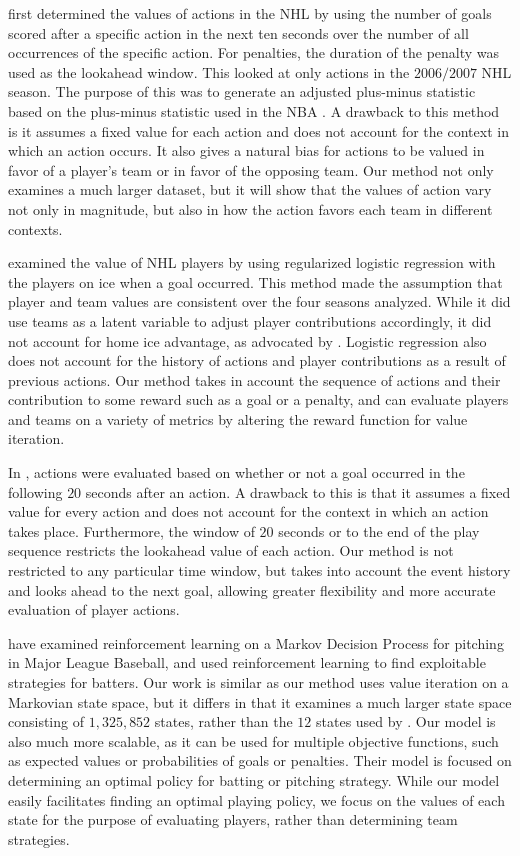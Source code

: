 \documentclass[]{article}
\begin{document}
\citep{Lock2009} first determined the values of actions in the NHL by using the number of goals scored after a specific action in the next ten seconds over the number of all occurrences of the specific action. For penalties, the duration of the penalty was used as the lookahead window. This looked at only actions in the $2006/2007$ NHL season. The purpose of this was to generate an adjusted plus-minus statistic based on the plus-minus statistic used in the NBA \citep{Rosenbaum2004}. A drawback to this method is it assumes a fixed value for each action and does not account for the context in which an action occurs. It also gives a natural bias for actions to be valued in favor of a player's team or in favor of the opposing team. Our method not only examines a much larger dataset, but it will show that the values of action vary not only in magnitude, but also in how the action favors each team in different contexts.

\citep{Gramacy2013} examined the value of NHL players by using regularized logistic regression with the players on ice when a goal occurred. This method made the assumption that player and team values are consistent over the four seasons analyzed. While it did use teams as a latent variable to adjust player contributions accordingly, it did not account for home ice advantage, as advocated by \citep{Schuckers2013}. Logistic regression also does not account for the history of actions and player contributions as a result of previous actions. Our method takes in account the sequence of actions and their contribution to some reward such as a goal or a penalty, and can evaluate players and teams on a variety of metrics by altering the reward function for value iteration.

In \citep{Schuckers2013}, actions were evaluated based on whether or not a goal occurred in the following $20$ seconds after an action. A drawback to this is that it assumes a fixed value for every action and does not account for the context in which an action takes place. Furthermore, the window of $20$ seconds or to the end of the play sequence restricts the lookahead value of each action. Our method is not restricted to any particular time window, but takes into account the event history and looks ahead to the next goal, allowing greater flexibility and more accurate evaluation of player actions.

\citep{Sidhu2014} have examined reinforcement learning on a Markov Decision Process for pitching in Major League Baseball, and used reinforcement learning to find exploitable strategies for batters. Our work is similar as our method uses value iteration on a Markovian state space, but it differs in that it examines a much larger state space consisting of $1,325,852$ states, rather than the $12$ states used by \citep{Sidhu2014}. Our model is also much more scalable, as it can be used for multiple objective functions, such as expected values or probabilities of goals or penalties. Their model is focused on determining an optimal policy for batting or pitching strategy. While our model easily facilitates finding an optimal playing policy, we focus on the values of each state for the purpose of evaluating players, rather than determining team strategies.
\end{document}
